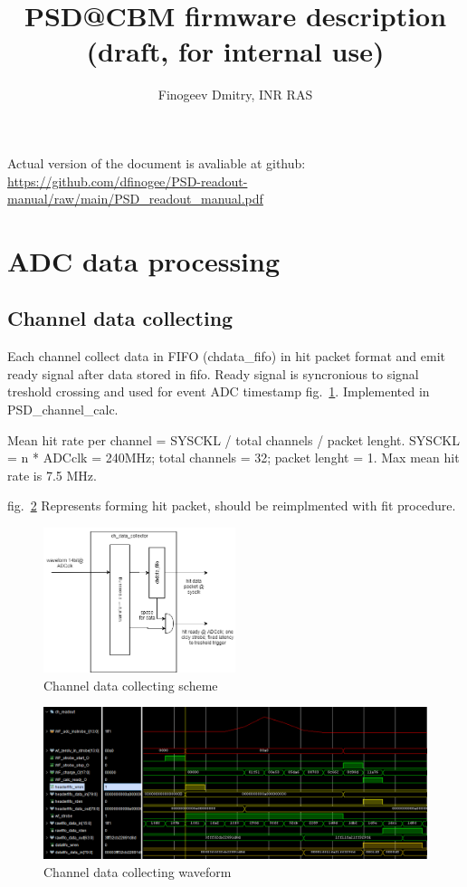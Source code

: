 \documentclass{article}
\title{PSD@CBM firmware description (draft, for internal use)}
\author{Finogeev Dmitry, INR RAS}
\begin{document}
\maketitle

Actual version of the document is avaliable at github:
\newline
\url{https://github.com/dfinogee/PSD-readout-manual/raw/main/PSD_readout_manual.pdf}



\tableofcontents

\newpage

\section{ADC data processing}

\subsection{Channel data collecting}
Each channel collect data in FIFO (chdata\_fifo) in hit packet format and emit ready signal after data stored in fifo. Ready signal is syncronious to signal treshold crossing and used for event ADC timestamp fig.~\ref{fig:1}. Implemented in PSD\_channel\_calc.

Mean hit rate per channel = SYSCKL / total channels / packet lenght. SYSCKL = n * ADCclk = 240MHz; total channels = 32; packet lenght = 1. Max mean hit rate is 7.5 MHz.

fig.~\ref{fig:2} Represents forming hit packet, should be reimplmented with fit procedure. 


\begin{figure}[H]
	\centering 
	\includegraphics[width=0.5\textwidth]{ADC_event_collection.png}
	\caption{\label{fig:1} Channel data collecting scheme}
\end{figure}

\begin{figure}[H]
	\centering 
	\includegraphics[width=1.0\textwidth]{ADC_ch_data_collector_wave.png}
	\caption{\label{fig:2} Channel data collecting waveform}
\end{figure}
\end{document}
